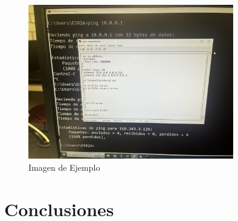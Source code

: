     \begin{figure}[H]
        \centering
        \includegraphics[width=0.8\textwidth]{img/6.jpg}
        \caption{Imagen de Ejemplo}
        \label{fig:Imagen_Ejemplo6}
    \end{figure}



\section{Conclusiones}

